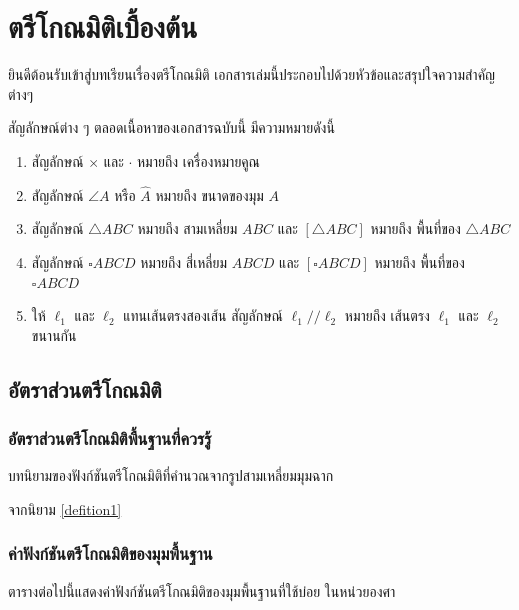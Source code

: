 \chapter{ตรีโกณมิติเบื้องต้น}
ยินดีต้อนรับเข้าสู่บทเรียนเรื่องตรีโกณมิติ เอกสารเล่มนี้ประกอบไปด้วยหัวข้อและสรุปใจความสำคัญต่างๆ

\begin{agreementbox}
	สัญลักษณ์ต่าง ๆ ตลอดเนื้อหาของเอกสารฉบับนี้ มีความหมายดังนี้
	\begin{enumerate}
		\item สัญลักษณ์ $\times$ และ $\cdot$ หมายถึง เครื่องหมายคูณ
		\item สัญลักษณ์ $\angle A$ หรือ $\hat{A}$ หมายถึง ขนาดของมุม $A$
		\item สัญลักษณ์ $\triangle ABC$ หมายถึง สามเหลี่ยม $ABC$ และ $[\triangle ABC]$ หมายถึง พื้นที่ของ $\triangle ABC$
		\item สัญลักษณ์ $\square ABCD$ หมายถึง สี่เหลี่ยม $ABCD$ และ $[\square ABCD]$ หมายถึง พื้นที่ของ $\square ABCD$
		\item ให้ $\ell_1$ และ $\ell_2$ แทนเส้นตรงสองเส้น สัญลักษณ์ $\ell_1 // \ell_2$ หมายถึง เส้นตรง $\ell_1$ และ $\ell_2$ ขนานกัน
	\end{enumerate} 
\end{agreementbox}

\section{อัตราส่วนตรีโกณมิติ}
\subsection{อัตราส่วนตรีโกณมิติพื้นฐานที่ควรรู้}

\begin{definitionbox} \label{defition1}
	บทนิยามของฟังก์ชันตรีโกณมิติที่คำนวณจากรูปสามเหลี่ยมมุมฉาก
\end{definitionbox}
จากนิยาม \ref{defition1} 

\subsection{ค่าฟังก์ชันตรีโกณมิติของมุมพื้นฐาน}
ตารางต่อไปนี้แสดงค่าฟังก์ชันตรีโกณมิติของมุมพื้นฐานที่ใช้บ่อย ในหน่วยองศา

